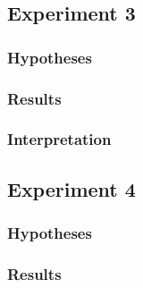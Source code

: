 \documentclass[11pt]{article}
\begin{document}
\subsubsection{}

\subsection{Experiment 3}

\subsubsection{Hypotheses}


\subsubsection{Results}


\subsubsection{Interpretation}


\subsubsection{}

\subsection{Experiment 4}

\subsubsection{Hypotheses}


\subsubsection{Results}
\end{document}
